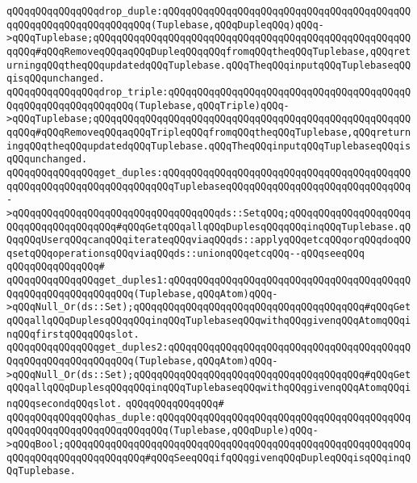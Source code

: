 \verb|qQQqqQQqqQQqqQQqdrop_duple:qQQqqQQqqQQqqQQqqQQqqQQqqQQqqQQqqQQqqQQqqQQqqQQqqQQqqQQqqQQqqQQqqQQq(Tuplebase,qQQqDupleqQQq)qQQq->qQQqTuplebase;qQQqqQQqqQQqqQQqqQQqqQQqqQQqqQQqqQQqqQQqqQQqqQQqqQQqqQQqqQQq#qQQqRemoveqQQqaqQQqDupleqQQqqQQqfromqQQqtheqQQqTuplebase,qQQqreturningqQQqtheqQQqupdatedqQQqTuplebase.qQQqTheqQQqinputqQQqTuplebaseqQQqisqQQqunchanged.|\newline
\verb|qQQqqQQqqQQqqQQqdrop_triple:qQQqqQQqqQQqqQQqqQQqqQQqqQQqqQQqqQQqqQQqqQQqqQQqqQQqqQQqqQQqqQQq(Tuplebase,qQQqTriple)qQQq->qQQqTuplebase;qQQqqQQqqQQqqQQqqQQqqQQqqQQqqQQqqQQqqQQqqQQqqQQqqQQqqQQqqQQq#qQQqRemoveqQQqaqQQqTripleqQQqfromqQQqtheqQQqTuplebase,qQQqreturningqQQqtheqQQqupdatedqQQqTuplebase.qQQqTheqQQqinputqQQqTuplebaseqQQqisqQQqunchanged.|\newline
\newline
\newline
\verb|qQQqqQQqqQQqqQQqget_duples:qQQqqQQqqQQqqQQqqQQqqQQqqQQqqQQqqQQqqQQqqQQqqQQqqQQqqQQqqQQqqQQqqQQqqQQqTuplebaseqQQqqQQqqQQqqQQqqQQqqQQqqQQqqQQq->qQQqqQQqqQQqqQQqqQQqqQQqqQQqqQQqqQQqds::SetqQQq;qQQqqQQqqQQqqQQqqQQqqQQqqQQqqQQqqQQqqQQq#qQQqGetqQQqallqQQqDuplesqQQqqQQqinqQQqTuplebase.qQQqqQQqUserqQQqcanqQQqiterateqQQqviaqQQqds::applyqQQqetcqQQqorqQQqdoqQQqsetqQQqoperationsqQQqviaqQQqds::unionqQQqetcqQQq--qQQqseeqQQq|\newline
\verb|qQQqqQQqqQQqqQQq#|\newline
\verb|qQQqqQQqqQQqqQQqget_duples1:qQQqqQQqqQQqqQQqqQQqqQQqqQQqqQQqqQQqqQQqqQQqqQQqqQQqqQQqqQQqqQQq(Tuplebase,qQQqAtom)qQQq->qQQqNull_Or(ds::Set);qQQqqQQqqQQqqQQqqQQqqQQqqQQqqQQqqQQqqQQq#qQQqGetqQQqallqQQqDuplesqQQqqQQqinqQQqTuplebaseqQQqwithqQQqgivenqQQqAtomqQQqinqQQqfirstqQQqqQQqslot.|\newline
\verb|qQQqqQQqqQQqqQQqget_duples2:qQQqqQQqqQQqqQQqqQQqqQQqqQQqqQQqqQQqqQQqqQQqqQQqqQQqqQQqqQQqqQQq(Tuplebase,qQQqAtom)qQQq->qQQqNull_Or(ds::Set);qQQqqQQqqQQqqQQqqQQqqQQqqQQqqQQqqQQqqQQq#qQQqGetqQQqallqQQqDuplesqQQqqQQqinqQQqTuplebaseqQQqwithqQQqgivenqQQqAtomqQQqinqQQqsecondqQQqslot.|\newline
\verb|qQQqqQQqqQQqqQQq#|\newline
\verb|qQQqqQQqqQQqqQQqhas_duple:qQQqqQQqqQQqqQQqqQQqqQQqqQQqqQQqqQQqqQQqqQQqqQQqqQQqqQQqqQQqqQQqqQQqqQQq(Tuplebase,qQQqDuple)qQQq->qQQqBool;qQQqqQQqqQQqqQQqqQQqqQQqqQQqqQQqqQQqqQQqqQQqqQQqqQQqqQQqqQQqqQQqqQQqqQQqqQQqqQQqqQQq#qQQqSeeqQQqifqQQqgivenqQQqDupleqQQqisqQQqinqQQqTuplebase.|\newline
\newline
